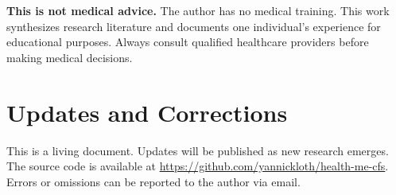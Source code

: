 \textbf{This is not medical advice.} The author has no medical training. This work synthesizes research literature and documents one individual's experience for educational purposes. Always consult qualified healthcare providers before making medical decisions.

\section*{Updates and Corrections}

This is a living document. Updates will be published as new research emerges. The source code is available at \url{https://github.com/yannickloth/health-me-cfs}. Errors or omissions can be reported to the author via email.

